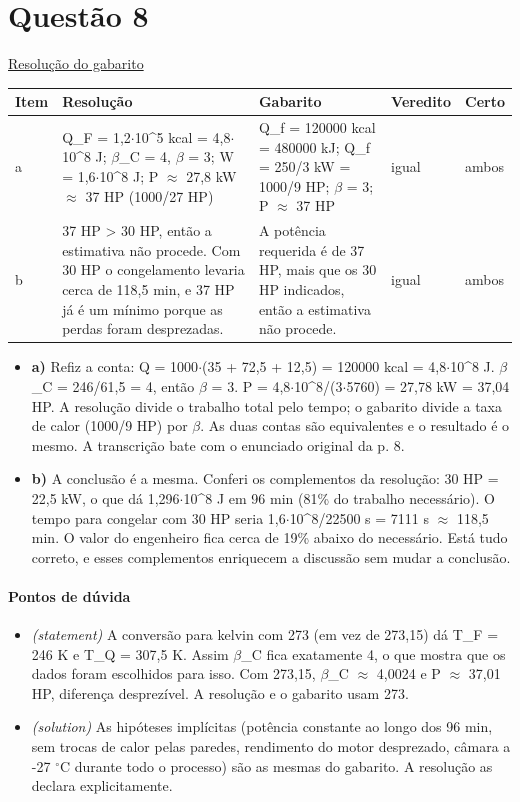 \documentclass{article}%
\begin{document}
\section*{Questão 8}%
\href{https://poliedroresolve.sistemapoliedro.com.br/vestibulares/ime/2026/ime-2-fase-dia-2-24-10-2025-2-fase-dia-2/dissertativa-8-fisica-2-fase-dia-2-ime-2026}{Resolução do gabarito}\par\smallskip%
\begin{longtable}{@{}p{} p{} p{} p{} p{}@{}}\toprule Item & Resolução & Gabarito & Veredito & Certo \\ \midrule
a & Q\_F = 1,2$\cdot$10\^{}5 kcal = 4,8$\cdot$10\^{}8 J; $\beta$\_C = 4, $\beta$ = 3; W = 1,6$\cdot$10\^{}8 J; P $\approx$ 27,8 kW $\approx$ 37 HP (1000/27 HP) & Q\_f = 120000 kcal = 480000 kJ; Q\_f = 250/3 kW = 1000/9 HP; $\beta$ = 3; P $\approx$ 37 HP & igual & ambos \\
b & 37 HP > 30 HP, então a estimativa não procede. Com 30 HP o congelamento levaria cerca de 118,5 min, e 37 HP já é um mínimo porque as perdas foram desprezadas. & A potência requerida é de 37 HP, mais que os 30 HP indicados, então a estimativa não procede. & igual & ambos \\
\bottomrule\end{longtable}%
\begin{itemize}%
\item%
\textbf{a)} Refiz a conta: Q = 1000$\cdot$(35 + 72,5 + 12,5) = 120000 kcal = 4,8$\cdot$10\^{}8 J. $\beta$\_C = 246/61,5 = 4, então $\beta$ = 3. P = 4,8$\cdot$10\^{}8/(3$\cdot$5760) = 27,78 kW = 37,04 HP. A resolução divide o trabalho total pelo tempo; o gabarito divide a taxa de calor (1000/9 HP) por $\beta$. As duas contas são equivalentes e o resultado é o mesmo. A transcrição bate com o enunciado original da p. 8.%
\item%
\textbf{b)} A conclusão é a mesma. Conferi os complementos da resolução: 30 HP = 22,5 kW, o que dá 1,296$\cdot$10\^{}8 J em 96 min (81\% do trabalho necessário). O tempo para congelar com 30 HP seria 1,6$\cdot$10\^{}8/22500 s = 7111 s $\approx$ 118,5 min. O valor do engenheiro fica cerca de 19\% abaixo do necessário. Está tudo correto, e esses complementos enriquecem a discussão sem mudar a conclusão.%
\end{itemize}%
\paragraph{Pontos de dúvida}%
\begin{itemize}%
\item%
\textit{(statement)} A conversão para kelvin com 273 (em vez de 273,15) dá T\_F = 246 K e T\_Q = 307,5 K. Assim $\beta$\_C fica exatamente 4, o que mostra que os dados foram escolhidos para isso. Com 273,15, $\beta$\_C $\approx$ 4,0024 e P $\approx$ 37,01 HP, diferença desprezível. A resolução e o gabarito usam 273.%
\item%
\textit{(solution)} As hipóteses implícitas (potência constante ao longo dos 96 min, sem trocas de calor pelas paredes, rendimento do motor desprezado, câmara a -27 $^\circ$C durante todo o processo) são as mesmas do gabarito. A resolução as declara explicitamente.%
\end{itemize}%
\end{document}
